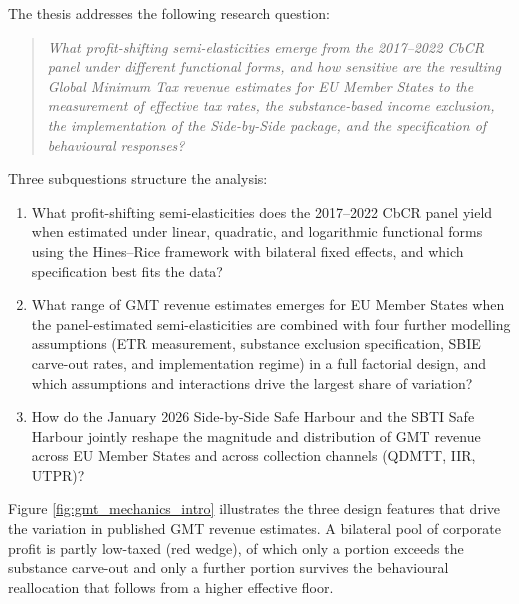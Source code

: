 \documentclass[11pt,a4paper]{article}
\begin{document}
The thesis addresses the following research question:

\begin{quote}
\textit{What profit-shifting semi-elasticities emerge from the 2017--2022 CbCR panel under different functional forms, and how sensitive are the resulting Global Minimum Tax revenue estimates for EU Member States to the measurement of effective tax rates, the substance-based income exclusion, the implementation of the Side-by-Side package, and the specification of behavioural responses?}
\end{quote}

Three subquestions structure the analysis:

\begin{enumerate}
\item What profit-shifting semi-elasticities does the 2017--2022 CbCR panel yield when estimated under linear, quadratic, and logarithmic functional forms using the Hines--Rice framework with bilateral fixed effects, and which specification best fits the data?
\item What range of GMT revenue estimates emerges for EU Member States when the panel-estimated semi-elasticities are combined with four further modelling assumptions (ETR measurement, substance exclusion specification, SBIE carve-out rates, and implementation regime) in a full factorial design, and which assumptions and interactions drive the largest share of variation?
\item How do the January 2026 Side-by-Side Safe Harbour and the SBTI Safe Harbour jointly reshape the magnitude and distribution of GMT revenue across EU Member States and across collection channels (QDMTT, IIR, UTPR)?
\end{enumerate}

Figure \ref{fig:gmt_mechanics_intro} illustrates the three design features that drive the variation in published GMT revenue estimates. A bilateral pool of corporate profit is partly low-taxed (red wedge), of which only a portion exceeds the substance carve-out and only a further portion survives the behavioural reallocation that follows from a higher effective floor.
\end{document}
